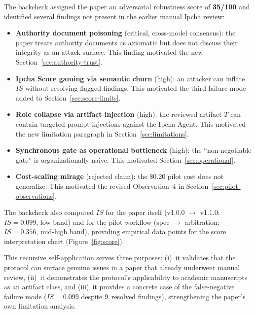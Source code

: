 \documentclass[11pt,a4paper]{article}
\begin{document}
The backcheck assigned the paper an adversarial robustness score of \textbf{35/100} and identified several findings not present in the earlier manual Ipcha review:
\begin{itemize}
  \item \textbf{Authority document poisoning} (critical, cross-model consensus): the paper treats authority documents as axiomatic but does not discuss their integrity as an attack surface. This finding motivated the new Section~\ref{sec:authority-trust}.
  \item \textbf{Ipcha Score gaming via semantic churn} (high): an attacker can inflate $\mathit{IS}$ without resolving flagged findings. This motivated the third failure mode added to Section~\ref{sec:score-limits}.
  \item \textbf{Role collapse via artifact injection} (high): the reviewed artifact $T$ can contain targeted prompt injections against the Ipcha Agent. This motivated the new limitation paragraph in Section~\ref{sec:limitations}.
  \item \textbf{Synchronous gate as operational bottleneck} (high): the ``non-negotiable gate'' is organizationally naive. This motivated Section~\ref{sec:operational}.
  \item \textbf{Cost-scaling mirage} (rejected claim): the \$0.20 pilot cost does not generalize. This motivated the revised Observation~4 in Section~\ref{sec:pilot-observations}.
\end{itemize}
The backcheck also computed $\mathit{IS}$ for the paper itself (v1.0.0 $\to$ v1.1.0: $\mathit{IS}=0.099$, low band) and for the pilot workflow (spec $\to$ arbitration: $\mathit{IS}=0.356$, mid-high band), providing empirical data points for the score interpretation chart (Figure~\ref{fig:score}).

This recursive self-application serves three purposes: (i)~it validates that the protocol can surface genuine issues in a paper that already underwent manual review, (ii)~it demonstrates the protocol's applicability to academic manuscripts as an artifact class, and (iii)~it provides a concrete case of the false-negative failure mode ($\mathit{IS}=0.099$ despite 9~resolved findings), strengthening the paper's own limitation analysis.

\end{document}
